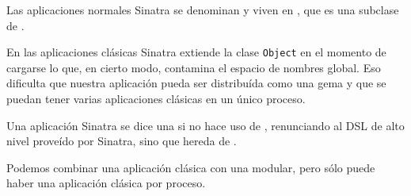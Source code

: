 
Las aplicaciones normales Sinatra se denominan 
y viven en ,
que es una subclase de .

En las aplicaciones clásicas Sinatra extiende la clase \verb|Object| en el momento 
de cargarse lo que, en cierto modo, contamina el espacio de nombres global. Eso dificulta que nuestra aplicación 
pueda ser distribuída como una gema y que se puedan tener varias aplicaciones clásicas 
en un único proceso.

Una aplicación Sinatra se dice una 
si no hace uso de ,
renunciando al DSL de alto nivel proveído por Sinatra,
sino que hereda de .

Podemos combinar una aplicación clásica  con una modular, pero sólo puede haber una aplicación clásica por proceso.

